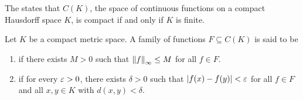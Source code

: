The  states that $C(K)$, the space of continuous functions on a compact Hausdorff space $K$, is compact if and only if $K$ is finite.

\begin{definition}
    Let $K$ be a compact metric space. A family of functions $F \subseteq C(K)$ is said to be
    \begin{enumerate}
        \item {} if there exists $M > 0$ such that $\left\lVert f\right\rVert_{\infty} \leq M$ for all $f \in F$.
        \item {} if for every $\varepsilon > 0$, there exists $\delta > 0$ such that $\left| f(x)-f(y) \right| < \varepsilon$ for all $f \in F$ and all $x,y \in K$ with $d(x,y) < \delta$.
    \end{enumerate}
\end{definition}

